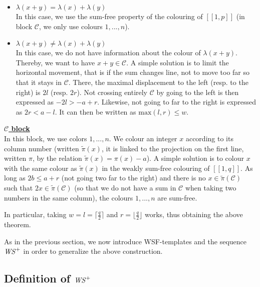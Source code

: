 \begin{itemize}
	\item \underline{\(\lambda(x+y) = \lambda(x) + \lambda(y)\)} \\
	In this case, we use the sum-free property of the colouring of \([\![1,p]\!]\) (in block \(\mathcal{C}\), we only use colours \(1, ..., n\)).

	\item \underline{\(\lambda(x+y) \neq \lambda(x) + \lambda(y)\)} \\
	In this case, we do not have information about the colour of \(\lambda(x+y)\). Thereby, we want to have \(x+y \in \mathcal{C}\).
	A simple solution is to limit the horizontal movement, that is if the sum changes line, not to move too far so that it stays in \(\mathcal{C}\).
	There, the maximal displacement to the left (resp. to the right) is \(2l\) (resp. \(2r\)). Not crossing entirely \(\mathcal{C}\) by going to the left
	is then expressed as \(-2l > -a + r\). Likewise, not going to far to the right is expressed as \(2r < a - l\). It can then be written as
	 \(\text{max}(l, r) \leqslant w\).
\end{itemize}

\underline{\textbf{\(\mathcal{C}\) block}} \\
In this block,  we use colors \(1, ..., n\). We colour an integer \(x\) according to its column number (written \(\tilde{\pi}(x)\), it is linked to the
projection on the first line, written \(\pi\), by the relation \(\tilde{\pi}(x) = \pi(x) - a\)). A simple solution is to colour \(x\) with the same colour
as \(\tilde{\pi}(x)\) in the weakly sum-free colouring of \([\![1,q]\!]\). As long as \(2b \leqslant a + r\) (not going two far to the right) and there
is no \(x \in \tilde{\pi}(\mathcal{C})\) such that \(2x \in \tilde{\pi}(\mathcal{C})\) (so that we do not have a sum in \(\mathcal{C}\) when
taking two numbers in the same column), the colours \(1, ..., n\) are sum-free.

In particular, taking \(w = l = \lceil \frac{q}{2} \rceil\) and \(r = \lfloor \frac{q}{2} \rfloor\) works, thus obtaining the above theorem.\\
\par
As in the previous section, we now introduce WSF-templates and the sequence \(\mathit{WS}^+\) in order to generalize the above construction.

\subsection{Definition of \(\mathit{WS}^+\)}

